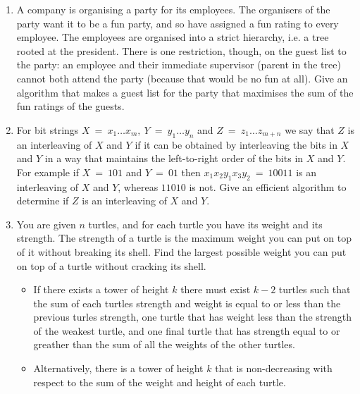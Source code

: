 \documentclass[a4paper]{article}
\begin{document}
\begin{enumerate}
\begin{itemize}
\end{itemize}

				\item A company is organising a party for its employees. The organisers of the party want it to be a fun party, and so have assigned a fun rating to every employee. The employees are organised into a strict hierarchy, i.e. a tree rooted at the president. There is one restriction, though, on the guest list to the party: an employee and their immediate supervisor (parent in the tree) cannot both attend the party (because that would be no fun at all). Give an algorithm that makes a guest list for the party that maximises the sum of the fun ratings of the guests.

				\item For bit strings $X\ =\ x_1 \dots x_m,\ Y\ =\ y_1\dots y_n$ and $Z\ =\ z_1 \dots z_{m+n}$ we say that $Z$ is an interleaving of $X$ and $Y$ if it can be obtained by interleaving the bits in $X$ and $Y$ in a way that maintains the left-to-right order of the bits in $X$ and $Y$. For example if $X\ =\ 101$ and $Y\ =\ 01$ then $x_1x_2y_1x_3y_2\ =\ 10011$ is an interleaving of $X$ and $Y$, whereas $11010$ is not. Give an efficient algorithm to determine if $Z$ is an interleaving of $X$ and $Y$.
				
				\item You are given $n$ turtles, and for each turtle you have its weight and its strength. The strength of a turtle is the maximum weight you can put on top of it without breaking its shell. Find the largest possible weight you can put on top of a turtle without cracking its shell.
\begin{itemize}
\item If there exists a tower of height $k$ there must exist $k-2$ turtles such that the sum of each turtles strength and weight is equal to or less than the previous turles strength, one turtle that has weight less than the strength of the weakest turtle, and one final turtle that has strength equal to or greather than the sum of all the weights of the other turtles.
\item Alternatively, there is a tower of height $k$ that is non-decreasing with respect to the sum of the weight and height of each turtle.


\end{itemize}
\end{enumerate}
\end{document}
